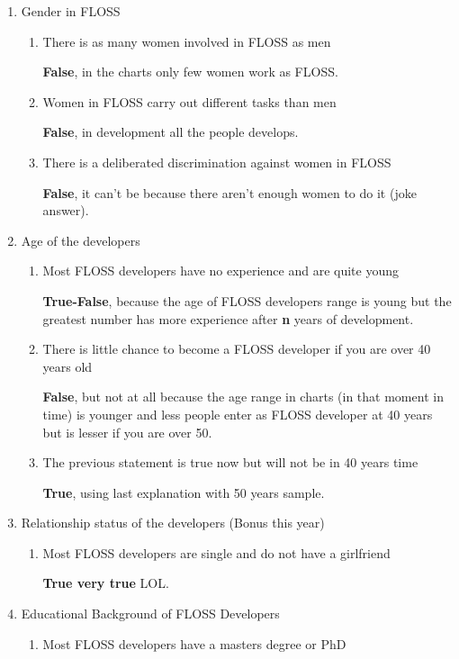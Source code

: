 \documentclass[11pt]{scrartcl}
\begin{document}
\begin{enumerate}

	\item Gender in FLOSS
	\begin{enumerate}
		\item There is as many women involved in FLOSS as men

		\textbf{False}, in the charts only few women work as FLOSS.
		\item Women in FLOSS carry out different tasks than men
		
		\textbf{False}, in development all the people develops.
		\item There is a deliberated discrimination against women in FLOSS
		
		\textbf{False}, it can't be because there aren't enough women to do it (joke answer).
	\end{enumerate}

	\item Age of the developers
	\begin{enumerate}
		\item Most FLOSS developers have no experience and are quite young
		
		\textbf{True-False}, because the age of FLOSS developers range is young but the greatest number has more experience after \textbf{n} years of development.
		\item There is little chance to become a FLOSS developer if you are over 40 years old
		
		\textbf{False}, but not at all because the age range in charts (in that moment in time) is younger and less people enter as FLOSS developer at 40 years but is lesser if you are over 50.
		\item The previous statement is true now but will not be in 40 years time
		
		\textbf{True}, using last explanation with 50 years sample.
	\end{enumerate}

	\item Relationship status of the developers (Bonus this year)
	\begin{enumerate}
		\item Most FLOSS developers are single and do not have a girlfriend
		
		\textbf{True very true} LOL.
	\end{enumerate}

	\item Educational Background of FLOSS Developers
	\begin{enumerate}
		\item Most FLOSS developers have a masters degree or PhD
		

\end{enumerate}
\end{enumerate}
\end{document}
